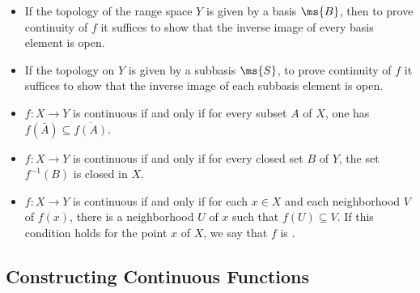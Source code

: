 \begin{itemize}
	\item If the topology of the range space $Y$ is given by a 
	basis $\ms{B}$, then to prove continuity of $f$ it suffices 
	to show that the inverse image of every basis element is open.
	
	\item If the topology on $Y$ is given by a subbasis $\ms{S}$, 
	to prove continuity of $f$ it suffices to show that the 
	inverse image of each subbasis element is open.
	
	\item $f:X \to Y$ is continuous if and only if for every 
	subset $A$ of $X$, one has $f(\bar{A}) \subseteq 
	\overline{f(A)}$.
	
	\item $f:X \to Y$ is continuous if and only if for every 
	closed set $B$ of $Y$, the set $f^{-1}(B)$ is closed in $X$.
	
	\item $f:X \to Y$ is continuous if and only if for each $x 
	\in X$ and each neighborhood $V$ of $f(x)$, there is a 
	neighborhood $U$ of $x$ such that $f(U) \subseteq V$. If this 
	condition holds for the point $x$ of $X$, we say that $f$ is 
	.
\end{itemize}


\subsection{Constructing Continuous Functions}

